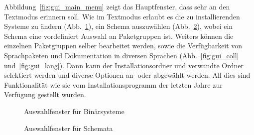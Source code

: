 Abbildung~\ref{fig:gui_main_menu} zeigt das Hauptfenster, dass sehr
an den Textmodus erinnern soll. Wie im Textmodus erlaubt es die zu
installierenden Systeme zu ändern (Abb.~\ref{fig:gui_systems}), ein
Schema auszuwählen (Abb.~\ref{fig:gui_scheme}), wobei ein Schema
eine vordefiniert Auswahl an Paketgruppen ist. Weiters können 
die einzelnen Paketgruppen selber bearbeitet werden, sowie die
Verfügbarkeit von Sprachpaketen und Dokumentation in diversen Sprachen
(Abb.~\ref{fig:gui_coll} und~\ref{fig:gui_lang}). Dann kann der
Installationsordner und verwandte Ordner selektiert werden und 
diverse Optionen an- oder abgewählt werden. All dies sind Funktionalität
wie sie vom Installationsprogramm der letzten Jahre zur Verfügung 
gestellt wurden.

\begin{figure}[ht!]
  \centering
  \caption{Auswahlfenster für Binärsysteme}
  \label{fig:gui_systems}
\end{figure}

\begin{figure}[ht!]
  \centering
  \caption{Auswahlfenster für Schemata}
  \label{fig:gui_scheme}
\end{figure}

